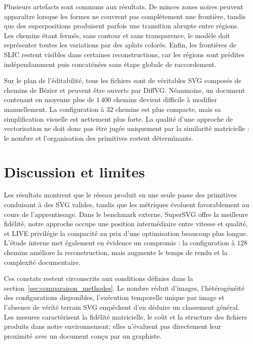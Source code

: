 \documentclass[12pt, a4paper, oneside]{report}
\begin{document}
Plusieurs artefacts sont communs aux résultats. De minces zones noires peuvent apparaître lorsque les formes ne couvrent pas complètement une frontière, tandis que des superpositions produisent parfois une transition abrupte entre régions. Les chemins étant fermés, sans contour et sans transparence, le modèle doit représenter toutes les variations par des aplats colorés. Enfin, les frontières de SLIC restent visibles dans certaines reconstructions, car les régions sont prédites indépendamment puis concaténées sans étape globale de raccordement.

Sur le plan de l'éditabilité, tous les fichiers sont de véritables SVG composés de chemins de Bézier et peuvent être ouverts par DiffVG. Néanmoins, un document contenant en moyenne plus de $1\,400$ chemins devient difficile à modifier manuellement. La configuration à $32$ chemins est plus compacte, mais sa simplification visuelle est nettement plus forte. La qualité d'une approche de vectorisation ne doit donc pas être jugée uniquement par la similarité matricielle : le nombre et l'organisation des primitives restent déterminants.

\section{Discussion et limites}
\label{sec:discussion_limites_resultats}

Les résultats montrent que le réseau produit en une seule passe des primitives conduisant à des SVG valides, tandis que les métriques évoluent favorablement au cours de l'apprentissage. Dans le benchmark externe, SuperSVG offre la meilleure fidélité, notre approche occupe une position intermédiaire entre vitesse et qualité, et LIVE privilégie la compacité au prix d'une optimisation beaucoup plus longue. L'étude interne met également en évidence un compromis : la configuration à $128$ chemins améliore la reconstruction, mais augmente le temps de rendu et la complexité documentaire.

Ces constats restent circonscrits aux conditions définies dans la section~\ref{sec:comparaison_methodes}. Le nombre réduit d'images, l'hétérogénéité des configurations disponibles, l'exécution temporelle unique par image et l'absence de vérité terrain SVG empêchent d'en déduire un classement général. Les mesures caractérisent la fidélité matricielle, le coût et la structure des fichiers produits dans notre environnement; elles n'évaluent pas directement leur proximité avec un document conçu par un graphiste.
\end{document}
